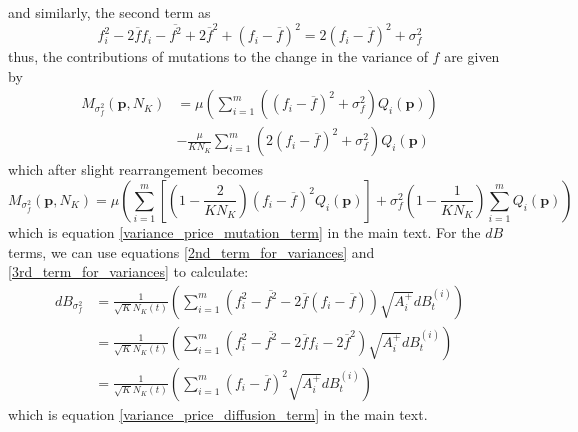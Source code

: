 and similarly, the second term as
\begin{equation*}
f^2_i - 2\overline{f}f_i -\overline{f^2}+2\overline{f}^2 + (f_i - \overline{f})^2 = 2(f_i - \overline{f})^2 + \sigma^2_f
\end{equation*}
thus, the contributions of mutations to the change in the variance of $f$ are given by
\begin{equation}
\begin{aligned}
M_{\sigma^2_f}(\mathbf{p},N_K) &= \mu\left(\sum\limits_{i=1}^{m}\left((f_i - \overline{f})^2 + \sigma^2_f\right)Q_i(\mathbf{p})\right)\\
&- \frac{\mu}{KN_K}\sum\limits_{i=1}^{m}\left(2(f_i - \overline{f})^2 + \sigma^2_f\right)Q_i(\mathbf{p}) 
\end{aligned}
\end{equation}
which after slight rearrangement becomes
\begin{equation}
M_{\sigma^2_f}(\mathbf{p},N_K) = \mu\left(\sum\limits_{i=1}^{m}\left[\left(1 - \frac{2}{KN_K}\right)(f_i - \overline{f})^2Q_i(\mathbf{p})\right] + \sigma^2_f\left(1 - \frac{1}{KN_K}\right)\sum\limits_{i=1}^{m}Q_i(\mathbf{p})\right)
\end{equation}
which is equation \eqref{variance_price_mutation_term} in the main text. For the $dB$ terms, we can use equations \eqref{2nd_term_for_variances} and \eqref{3rd_term_for_variances} to calculate:
\begin{align}
dB_{\sigma^2_{f}} &=  \frac{1}{\sqrt{K}N_{K}(t)}\left(\sum\limits_{i=1}^{m}\left(f^2_i - \overline{f^2} - 2 \overline{f}(f_i - \overline{f})\right)\sqrt{A_i^+}dB_{t}^{(i)}\right)\\
&= \frac{1}{\sqrt{K}N_{K}(t)}\left(\sum\limits_{i=1}^{m}\left(f^2_i - \overline{f^2} - 2 \overline{f}f_i - 2\overline{f}^2\right)\sqrt{A_i^+}dB_{t}^{(i)}\right)\\
&= \frac{1}{\sqrt{K}N_{K}(t)}\left(\sum\limits_{i=1}^{m}\left(f_i - \overline{f}\right)^2\sqrt{A_i^+}dB_{t}^{(i)}\right)
\end{align}
which is equation \eqref{variance_price_diffusion_term} in the main text.
